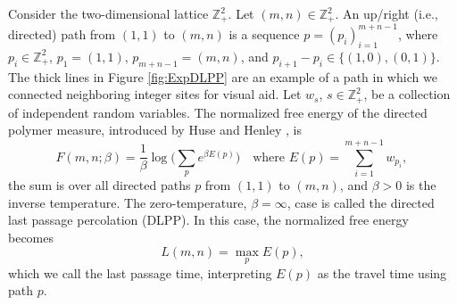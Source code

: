 \documentclass[10pt]{article}
\theoremstyle{plain}
\theoremstyle{definition}
\newcommand{\beqq}{ \begin{equation*} }
\newcommand{\eeqq}{ \end{equation*} }
\newcommand{\Z}{\mathbb{Z}}
\numberwithin{equation}{section}
\begin{document}
Consider the two-dimensional lattice $\Z_+^2$. Let $(m,n)\in \Z_+^2$. 
An up/right (i.e., directed) path from $(1,1)$ to $(m,n)$ is a sequence $p=(p_i)_{i=1}^{m+n-1}$, where $p_i\in \Z_+^2$, $p_1=(1,1)$,  $p_{m+n-1}=(m,n)$, and $p_{i+1}-p_i\in \{(1,0), (0,1)\}$. 
The thick lines in Figure \ref{fig:ExpDLPP} are an example of a path in which we connected neighboring integer sites for visual aid. 
Let $w_s$, $s\in \Z_+^2$, be a collection of independent random variables. 
The normalized free energy of the directed polymer measure, introduced by Huse and Henley \cite{Huse-Henley85}, is 
\beqq
	F(m,n; \beta)= \frac1{\beta} \log \Big( \sum_{p} e^{\beta E(p)} \Big) \quad  \text{where $E(p)= \sum_{i=1}^{m+n-1} w_{p_i}$, }
\eeqq
the sum is over all directed paths $p$ from $(1,1)$ to $(m,n)$, and $\beta>0$ is the inverse temperature. 
The zero-temperature, $\beta=\infty$, case is called the directed last passage percolation (DLPP). 
In this case, the normalized free energy becomes 
\beqq
	L(m,n)= \max_{p} E(p), %
\eeqq
which we call the last passage time, interpreting $E(p)$ as the travel time using path $p$. 
\end{document}

